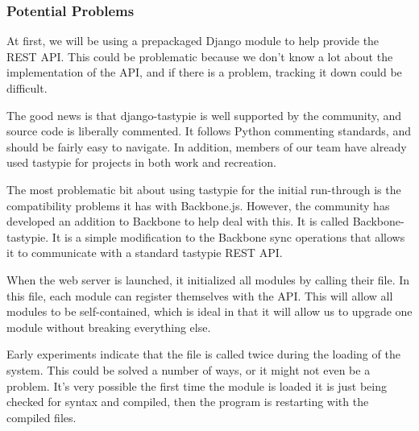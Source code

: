 \subsubsection{Potential Problems}

At first, we will be using a prepackaged Django module to help provide the \ac{REST} \ac{API}.
This could be problematic because we don't know a lot about the implementation of the \ac{API}, and if there is a problem, tracking it down could be difficult.

The good news is that django-tastypie is well supported by the community, and source code is liberally commented.
It follows Python commenting standards, and should be fairly easy to navigate.
In addition, members of our team have already used tastypie for projects in both work and recreation.

The most problematic bit about using tastypie for the initial run-through is the compatibility problems it has with Backbone.js.
However, the community has developed an addition to Backbone to help deal with this.
It is called Backbone-tastypie.
It is a simple modification to the Backbone sync operations that allows it to communicate with a standard tastypie \ac{REST} \ac{API}.

When the web server is launched, it initialized all modules by calling their  file.
In this file, each module can register themselves with the \ac{API}.
This will allow all modules to be self-contained, which is ideal in that it will allow us to upgrade one module without breaking everything else.

Early experiments indicate that the  file is called twice during the loading of the system.
This could be solved a number of ways, or it might not even be a problem. 
It's very possible the first time the module is loaded it is just being checked for syntax and compiled, then the program is restarting with the compiled files.
